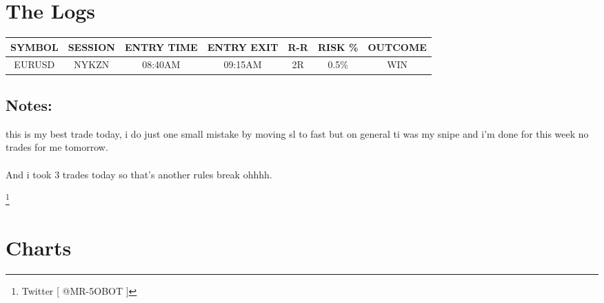 \documentclass{article}
\begin{document}
\section{The Logs}
\vspace{0.3cm}

\renewcommand{\arraystretch}{1.5} %
\setlength{\tabcolsep}{10pt} %

\begin{center}
\begin{tabular}{|c|c|c|c|c|c|c|}
  \hline
  SYMBOL & SESSION & ENTRY TIME & ENTRY EXIT & R-R & RISK \% & OUTCOME \\ 
  \hline 
  EURUSD & NYKZN & 08:40AM & 09:15AM & 2R & 0.5\% & WIN \\  
  \hline
\end{tabular}
\end{center}
\vspace{0.1cm}

\begin{notebox}
\subsection{Notes:}

\begin{notesbox}
\noindent this is my best trade today, i do just one small mistake by moving sl to fast but on general ti was my snipe and i'm done for this week no trades for me tomorrow. 
\\\\ And i took 3 trades today so that's another rules break ohhhh.
\end{notesbox}
\end{notebox}

\footnote{Twitter [ @MR-5OBOT ]}
\newpage

\vspace{0.4cm}

\section{Charts}
\end{document}
